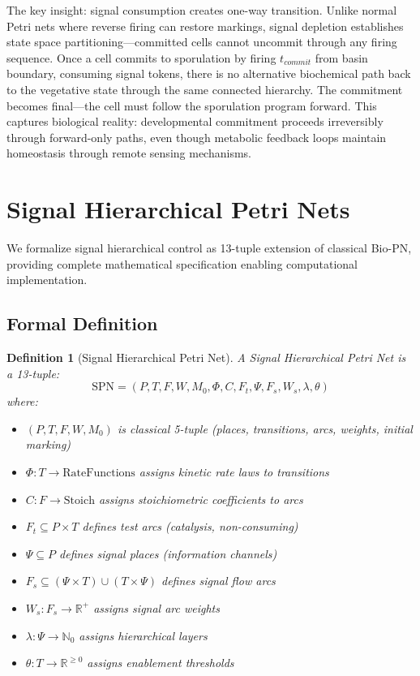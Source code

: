 \documentclass[10pt,letterpaper]{article}
\newtheorem{definition}{Definition}
\begin{document}
The key insight: signal consumption creates one-way transition. Unlike normal Petri nets where reverse firing can restore markings, signal depletion establishes state space partitioning---committed cells cannot uncommit through any firing sequence. Once a cell commits to sporulation by firing $t_{commit}$ from basin boundary, consuming signal tokens, there is no alternative biochemical path back to the vegetative state through the same connected hierarchy. The commitment becomes final---the cell must follow the sporulation program forward. This captures biological reality: developmental commitment proceeds irreversibly through forward-only paths, even though metabolic feedback loops maintain homeostasis through remote sensing mechanisms.


\section{Signal Hierarchical Petri Nets}

We formalize signal hierarchical control as 13-tuple extension of classical Bio-PN, providing complete mathematical specification enabling computational implementation.

\subsection{Formal Definition}

\begin{definition}[Signal Hierarchical Petri Net]
A Signal Hierarchical Petri Net is a 13-tuple:
\begin{equation}
\text{SPN} = (P, T, F, W, M_0, \Phi, C, F_t, \Psi, F_s, W_s, \lambda, \theta)
\end{equation}
where:
\begin{itemize}
\item $(P, T, F, W, M_0)$ is classical 5-tuple (places, transitions, arcs, weights, initial marking)
\item $\Phi: T \rightarrow \text{RateFunctions}$ assigns kinetic rate laws to transitions
\item $C: F \rightarrow \text{Stoich}$ assigns stoichiometric coefficients to arcs
\item $F_t \subseteq P \times T$ defines test arcs (catalysis, non-consuming)
\item $\Psi \subseteq P$ defines signal places (information channels)
\item $F_s \subseteq (\Psi \times T) \cup (T \times \Psi)$ defines signal flow arcs
\item $W_s: F_s \rightarrow \mathbb{R}^+$ assigns signal arc weights
\item $\lambda: \Psi \rightarrow \mathbb{N}_0$ assigns hierarchical layers
\item $\theta: T \rightarrow \mathbb{R}^{\geq 0}$ assigns enablement thresholds
\end{itemize}
\end{definition}
\end{document}
